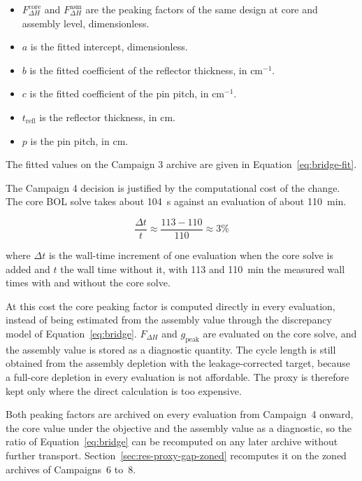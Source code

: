 \begin{itemize}
  \item $F_{\Delta H}^\mathrm{core}$ and $F_{\Delta H}^\mathrm{asm}$
        are the peaking factors of the same design at core and assembly
        level, dimensionless.

  \item $a$ is the fitted intercept, dimensionless.

  \item $b$ is the fitted coefficient of the reflector thickness, in
        cm$^{-1}$.

  \item $c$ is the fitted coefficient of the pin pitch, in cm$^{-1}$.

  \item $t_\mathrm{refl}$ is the reflector thickness, in cm.

  \item $p$ is the pin pitch, in cm.
\end{itemize}

The fitted values on the Campaign 3 archive are given in
Equation~\eqref{eq:bridge-fit}.

The Campaign 4 decision is justified by the computational cost of the
change. The core BOL solve takes about \SI{104}{s} against an
evaluation of about \SI{110}{min}.

\begin{equation}
\frac{\Delta t}{t} \approx \frac{113 - 110}{110} \approx 3\%
\label{eq:corecost}
\end{equation}

\noindent where $\Delta t$ is the wall-time increment of one evaluation
when the core solve is added and $t$ the wall time without it, with 113
and \SI{110}{min} the measured wall times with and without the core
solve.

At this cost the core peaking factor is computed directly in every
evaluation, instead of being estimated from the assembly value through
the discrepancy model of Equation~\eqref{eq:bridge}. $F_{\Delta H}$ and
$g_\mathrm{peak}$ are evaluated on the core solve, and the assembly
value is stored as a diagnostic quantity. The cycle length is still
obtained from the assembly depletion with the leakage-corrected target,
because a full-core depletion in every evaluation is not affordable.
The proxy is therefore kept only where the direct calculation is too
expensive.

Both peaking factors are archived on every evaluation from Campaign~4
onward, the core value under the objective and the assembly value as a
diagnostic, so the ratio of Equation~\eqref{eq:bridge} can be
recomputed on any later archive without further transport.
Section~\ref{sec:res-proxy-gap-zoned} recomputes it on the zoned
archives of Campaigns~6 to~8.


